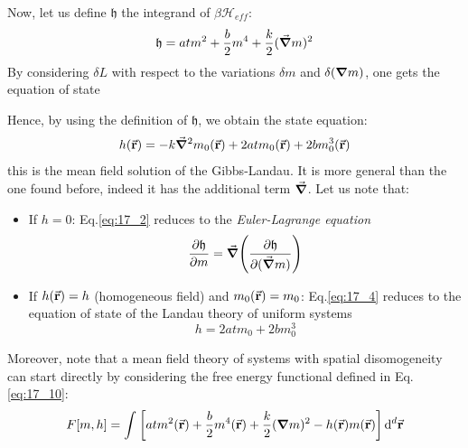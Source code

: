 \documentclass[../../Main/Main.tex]{subfiles}
\begin{document}
Now, let us define \( \mathfrak{h} \) the integrand of \( \beta \mathcal{H}_{eff} \):
\begin{equation*}
  \mathfrak{h} = a t m^2 + \frac{b}{2} m^4 + \frac{k}{2} (\va{\grad } m)^2
\end{equation*}
By considering \( \delta L \) with respect to the variations \( \delta m \) and \( \delta (\grad m) \), one gets the equation of state
Hence, by using the definition of \( \mathfrak{h} \), we obtain the state equation:
\begin{equation}
  h (\va{r}) = - k \va{\grad } ^2 m_0 (\va{r}) + 2 a t m _0 (\va{r}) + 2 b m_0^3 (\va{r})
   \label{eq:17_4}
\end{equation}
  this is the mean field solution of the Gibbs-Landau. It is more general than the one found before, indeed it has the additional term \( \va{\grad } \).
Let us note that:
\begin{itemize}
\item If \( h= 0 \): Eq.\eqref{eq:17_2} reduces to the \emph{Euler-Lagrange equation}
\begin{equation}
  \pdv{\mathfrak{h} }{m} = \va{\grad } \qty(  \pdv{\mathfrak{h}}{(\va{\grad } m)})
  \label{eq:17_11}
\end{equation}

\item If \( h (\va{r}) = h \) (homogeneous field) and \( m_0 (\va{r})=m_0 \): Eq.\eqref{eq:17_4} reduces to the equation of state of the Landau theory of uniform systems
\begin{equation*}
  h = 2 a t m_0 + 2 b m_0 ^3
\end{equation*}

\end{itemize}

 \begin{remark}
Moreover, note that a mean field theory of systems with spatial disomogeneity can start directly by considering the free energy functional defined in Eq.\eqref{eq:17_10}:
   \begin{equation*}
     F[m,h] = \int_{}^{}  \qty[a t m^2 (\va{r}) + \frac{b}{2} m^4 (\va{r}) + \frac{k}{2} (\grad m)^2 - h (\va{r}) m(\va{r})] \dd[d]{\va{r}}
   \end{equation*}
\end{remark}
\end{document}
